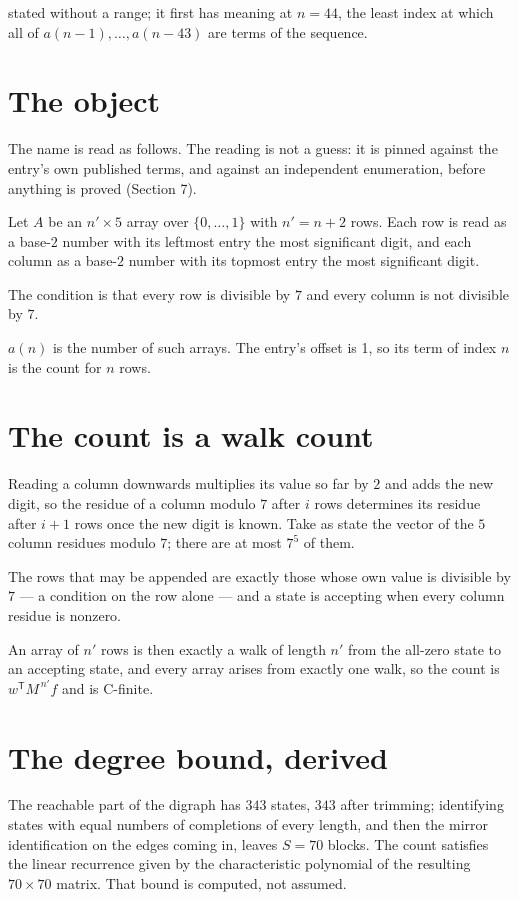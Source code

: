 \documentclass[11pt]{article}
\theoremstyle{definition}
\begin{document}
stated without a range; it first has meaning at $n = 44$, the least index at which all of $a(n-1),\dots,a(n-43)$ are terms of the sequence.

\section{The object}

The name is read as follows. The reading is not a guess: it is pinned against the entry's own published terms, and against an independent enumeration, before anything is proved (Section 7).

Let $A$ be an $n' \times 5$ array over $\{0,\dots,1\}$ with $n' = n + 2$ rows. Each row is read as a base-$2$ number with its leftmost entry the most significant digit, and each column as a base-$2$ number with its topmost entry the most significant digit.

The condition is that every row is divisible by $7$ and every column is not divisible by $7$.

$a(n)$ is the number of such arrays. The entry's offset is 1, so its term of index $n$ is the count for $n$ rows.

\section{The count is a walk count}

Reading a column downwards multiplies its value so far by $2$ and adds the new digit, so the residue of a column modulo $7$ after $i$ rows determines its residue after $i+1$ rows once the new digit is known. Take as state the vector of the $5$ column residues modulo $7$; there are at most $7^{5}$ of them.

The rows that may be appended are exactly those whose own value is divisible by $7$ --- a condition on the row alone --- and a state is accepting when every column residue is nonzero.

An array of $n'$ rows is then exactly a walk of length $n'$ from the all-zero state to an accepting state, and every array arises from exactly one walk, so the count is $w^{\mathsf T}M^{\,n'}f$ and is C-finite.

\section{The degree bound, derived}

The reachable part of the digraph has $343$ states, $343$ after trimming; identifying states with equal numbers of completions of every length, and then the mirror identification on the edges coming in, leaves $S = 70$ blocks. The count satisfies the linear recurrence given by the characteristic polynomial of the resulting $70\times70$ matrix. That bound is computed, not assumed.
\end{document}
